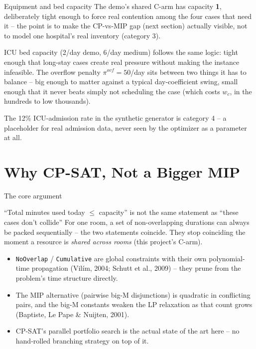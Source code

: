 \documentclass[aspectratio=169]{beamer}
\begin{document}
\begin{frame}{Equipment and bed capacity}
  The demo's shared C-arm has capacity \textbf{1}, deliberately tight
  enough to force real contention among the four cases that need it --
  the point is to make the CP-vs-MIP gap (next section) actually visible,
  not to model one hospital's real inventory (category 3).
  \vspace{0.5em}

  ICU bed capacity (2/day demo, 6/day medium) follows the same logic:
  tight enough that long-stay cases create real pressure without making
  the instance infeasible. The overflow penalty $\pi^{ovf}=50$/day sits
  between two things it has to balance -- big enough to matter against a
  typical day-coefficient swing, small enough that it never beats simply
  not scheduling the case (which costs $w_c$, in the hundreds to low
  thousands).
  \vspace{0.5em}

  \footnotesize The 12\% ICU-admission rate in the synthetic generator is
  category 4 -- a placeholder for real admission data, never seen by the
  optimizer as a parameter at all.
\end{frame}

\section{Why CP-SAT, Not a Bigger MIP}

\begin{frame}{The core argument}
  \begin{block}{``Total minutes used today $\le$ capacity'' is not the same
    statement as ``these cases don't collide''}
    For one room, a set of non-overlapping durations can always be packed
    sequentially -- the two statements coincide. They stop coinciding the
    moment a resource is \emph{shared across rooms} (this project's C-arm).
  \end{block}
  \pause
  \begin{itemize}
    \item \texttt{NoOverlap} / \texttt{Cumulative} are global constraints
      with their own polynomial-time propagation (Vil\'im, 2004; Schutt et
      al., 2009) -- they prune from the problem's time structure directly.
    \item The MIP alternative (pairwise big-M disjunctions) is quadratic in
      conflicting pairs, and the big-M constants weaken the LP relaxation
      as that count grows (Baptiste, Le Pape \& Nuijten, 2001).
    \item CP-SAT's parallel portfolio search is the actual state of the art
      here -- no hand-rolled branching strategy on top of it.
  \end{itemize}
  \hyperlink{backupG}{}
\end{frame}
\end{document}
